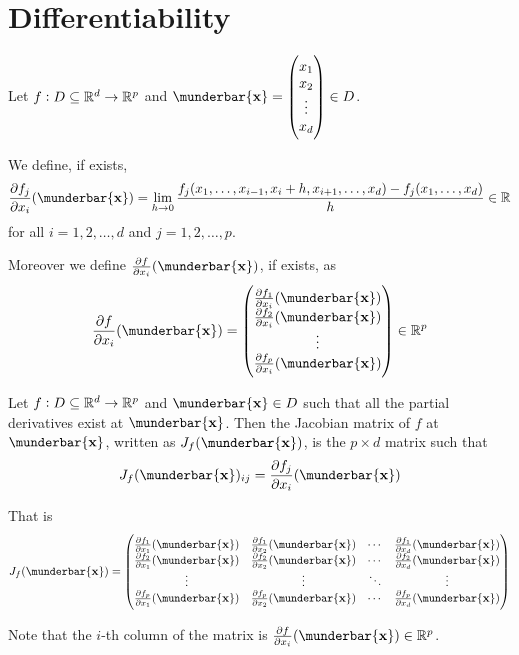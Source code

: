 \documentclass[14pt]{extarticle}
\renewcommand{\vec}[1]{\munderbar{\mathbf{#1}}}
\begin{document}
\section{Differentiability}

\begin{definition}
    Let $f: D \subseteq \mathbb{R}^d \to \mathbb{R}^p$ and $\vec{x} = \begin{pmatrix} x_1 \\ x_2 \\ \vdots \\ x_d \end{pmatrix} \in D$.

    We define, if exists,
    \begin{equation}
        \pdv{f_j}{x_i}()(\vec{x}) = \lim_{h \to 0} \frac{f_j(x_1, \ldots, x_{i-1}, x_i + h, x_{i+1}, \ldots, x_d) - f_j(x_1, \ldots, x_d)}{h} \in \R
    \end{equation}
    for all $i = 1, 2, \ldots, d$ and $j = 1, 2, \ldots, p$.

    Moreover we define $\pdv{f}{x_i}()(\vec{x})$, if exists, as
    \begin{equation}
        \pdv{f}{x_i}()(\vec{x}) = \begin{pmatrix}
            \pdv{f_1}{x_i}()(\vec{x}) \\
            \pdv{f_2}{x_i}()(\vec{x}) \\
            \vdots                    \\
            \pdv{f_p}{x_i}()(\vec{x})
        \end{pmatrix} \in \R^p
    \end{equation}
\end{definition}

\begin{definition}
    Let $f: D \subseteq \mathbb{R}^d \to \mathbb{R}^p$ and $\vec{x} \in D$ such that all the partial derivatives exist at $\vec{x}$.
    Then the Jacobian matrix of $f$ at $\vec{x}$, written as $J_f(\vec{x})$, is the $p \times d$ matrix such that
    \begin{equation}
        J_f(\vec{x})_{ij} = \pdv{f_j}{x_i}()(\vec{x})
    \end{equation}

    That is
    \begin{equation}
        J_f(\vec{x}) = \begin{pmatrix}
            \pdv{f_1}{x_1}()(\vec{x}) & \pdv{f_1}{x_2}()(\vec{x}) & \cdots & \pdv{f_1}{x_d}()(\vec{x}) \\
            \pdv{f_2}{x_1}()(\vec{x}) & \pdv{f_2}{x_2}()(\vec{x}) & \cdots & \pdv{f_2}{x_d}()(\vec{x}) \\
            \vdots                    & \vdots                    & \ddots & \vdots                    \\
            \pdv{f_p}{x_1}()(\vec{x}) & \pdv{f_p}{x_2}()(\vec{x}) & \cdots & \pdv{f_p}{x_d}()(\vec{x})
        \end{pmatrix}
    \end{equation}

    Note that the $i$-th column of the matrix is $\pdv{f}{x_i}()(\vec{x}) \in \R^p$.
\end{definition}
\end{document}
